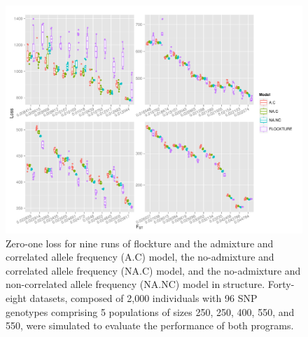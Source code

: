  \begin{figure}
\centering
  \includegraphics[width=.9\linewidth]{images/Figures-Pat/SNPloss.pdf}%
  \caption{Zero-one loss for nine runs of {\sc flockture} and the admixture and correlated allele 
  frequency (A.C) model, the no-admixture and correlated allele frequency (NA.C) model, 
and the no-admixture and non-correlated allele frequency (NA.NC) model in {\sc structure}. Forty-eight 
datasets, composed of 2,000 individuals with 96 SNP genotypes comprising 
5 populations of sizes 250, 250, 400, 550, and 550, were simulated to evaluate the performance
of both programs. }
  \label{fig:SNPloss}
\end{figure} 


